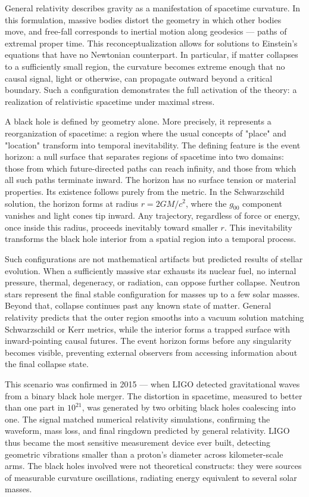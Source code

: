 General relativity describes gravity as a manifestation of spacetime curvature. In this formulation, massive bodies distort the geometry in which other bodies move, and free-fall corresponds to inertial motion along geodesics — paths of extremal proper time. This reconceptualization allows for solutions to Einstein's equations that have no Newtonian counterpart. In particular, if matter collapses to a sufficiently small region, the curvature becomes extreme enough that no causal signal, light or otherwise, can propagate outward beyond a critical boundary. Such a configuration demonstrates the full activation of the theory: a realization of relativistic spacetime under maximal stress.


A black hole is defined by geometry alone. More precisely, it represents a reorganization of spacetime: a region where the usual concepts of "place" and "location" transform into temporal inevitability. The defining feature is the event horizon: a null surface that separates regions of spacetime into two domains: those from which future-directed paths can reach infinity, and those from which all such paths terminate inward. The horizon has no surface tension or material properties. Its existence follows purely from the metric. In the Schwarzschild solution, the horizon forms at radius $r = 2GM/c^2$, where the $g_{00}$ component vanishes and light cones tip inward. Any trajectory, regardless of force or energy, once inside this radius, proceeds inevitably toward smaller $r$. This inevitability transforms the black hole interior from a spatial region into a temporal process.


Such configurations are not mathematical artifacts but predicted results of stellar evolution. When a sufficiently massive star exhausts its nuclear fuel, no internal pressure, thermal, degeneracy, or radiation, can oppose further collapse. Neutron stars represent the final stable configuration for masses up to a few solar masses. Beyond that, collapse continues past any known state of matter. General relativity predicts that the outer region smooths into a vacuum solution matching Schwarzschild or Kerr metrics, while the interior forms a trapped surface with inward-pointing causal futures. The event horizon forms before any singularity becomes visible, preventing external observers from accessing information about the final collapse state.


This scenario was confirmed in 2015 — when LIGO detected gravitational waves from a binary black hole merger. The distortion in spacetime, measured to better than one part in $10^{21}$, was generated by two orbiting black holes coalescing into one. The signal matched numerical relativity simulations, confirming the waveform, mass loss, and final ringdown predicted by general relativity. LIGO thus became the most sensitive measurement device ever built, detecting geometric vibrations smaller than a proton's diameter across kilometer-scale arms. The black holes involved were not theoretical constructs: they were sources of measurable curvature oscillations, radiating energy equivalent to several solar masses.


